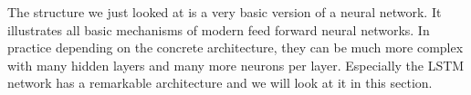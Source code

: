\documentclass[a4paper,12pt]{report}
\begin{document}
	
	
	
	
	
	
	
	
	
	
	
	
	
	
	
	
	
	
	
	
	
	
	
	
	
	
	
	
	

The structure we just looked at is a very basic version of a neural network. It illustrates all basic mechanisms of modern feed forward neural networks. In practice depending on the concrete architecture, they can be much more complex with many hidden layers and many more neurons per layer. Especially the LSTM network has a remarkable architecture and we will look at it in this section.
	
\end{document}
